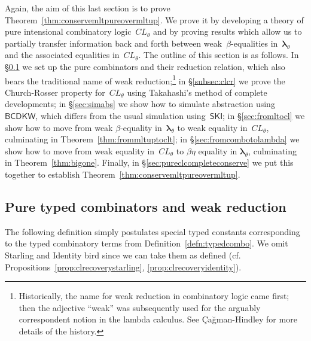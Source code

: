 \documentclass{lmcs} %
\newcommand{\param}{\theta}
\newcommand{\mltup}{\boldsymbol\lambda_{\param}}
\newcommand{\cltup}{CL_{\param}}
\begin{document}
Again, the aim of this last section is to prove Theorem~\ref{thm:conservemltpureovermltup}. We prove it by developing a theory of pure intensional combinatory logic~$\cltup$ and by proving results which allow us to partially transfer information back and forth between weak~$\beta$-equalities in~$\mltup$ and the associated equalities in~$\cltup$. The outline of this section is as follows. In \S\ref{sec:cl:combosandweak} we set up the pure combinators and their reduction relation, which also bears the traditional name of weak reduction;\footnote{Historically, the name for weak reduction in combinatory logic came first; then the adjective ``weak'' was subsequently used for the arguably correspondent notion in the lambda calculus. See \c{C}a{\u{g}}man-Hindley \cite[p. 240]{Cagman1998-pi} for more details of the history.} in \S\ref{subsec:clcr} we prove the Church-Rosser property for~$\cltup$ using Takahashi's method of complete developments; in \S\ref{sec:simabs} we show how to simulate abstraction using~$\mathsf{BCDKW}$, which differs from the usual simulation using~$\mathsf{SKI}$; in \S\ref{sec:fromltocl} we show how to move from weak $\beta$-equality in~$\mltup$ to weak equality in~$\cltup$, culminating in Theorem~\ref{thm:frommltuptoclt}; in \S\ref{sec:fromcombotolambda} we show how to move from weak equality in~$\cltup$ to $\beta\eta$ equality in $\mltup$, culminating in Theorem~\ref{thm:bigone}. Finally, in \S\ref{sec:pureclcompleteconserve} we put this together to establish Theorem~\ref{thm:conservemltpureovermltup}.


\subsection{Pure typed combinators and weak reduction}\label{sec:cl:combosandweak}

The following definition simply postulates special typed constants corresponding to the typed combinatory terms from Definition~\ref{defn:typedcombo}. We omit Starling and Identity bird since we can take them as defined (cf. Propositions~\ref{prop:clrecoverystarling}, \ref{prop:clrecoveryidentity}).
\end{document}
